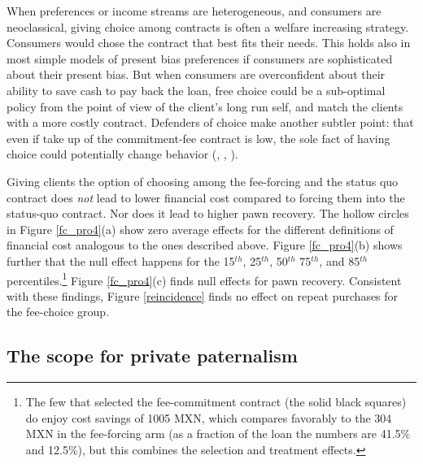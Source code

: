 \documentclass[oneside,11pt]{article}
\begin{document}
When preferences or income streams are heterogeneous, and consumers are neoclassical, giving choice among contracts is often a welfare increasing strategy. Consumers would chose the contract that best fits their needs. This holds also in most simple models of present bias preferences if consumers are sophisticated about their present bias. %
But when consumers are overconfident about their ability to save cash to pay back the loan, free choice could be a sub-optimal policy from the point of view of the client's long run self, and match the clients with a more costly contract. Defenders of choice make another subtler point: that even if take up of the commitment-fee contract is low, the sole fact of having choice could potentially change behavior (\cite{Dalboetal:2010}, \cite{Sjostrometal:2018}, \cite{Tlaxcala}). 

Giving clients the option of choosing among the fee-forcing and the status quo contract does \textit{not} lead to lower financial cost compared to forcing them into the status-quo contract. Nor does it lead to higher pawn recovery. The hollow circles in Figure \ref{fc_pro4}(a) show zero average effects for the different definitions of financial cost analogous to the ones described above. Figure \ref{fc_pro4}(b) shows further that the null effect happens for the 15$^{th}$, 25$^{th}$, 50$^{th}$ 75$^{th}$, and 85$^{th}$ percentiles.\footnote{The few that selected the fee-commitment contract (the solid black squares) do enjoy cost savings of 1005 MXN, which compares favorably to the 304 MXN in the fee-forcing arm (as a fraction of the loan the numbers are 41.5\% and 12.5\%), but this combines the selection and treatment effects.} %
Figure \ref{fc_pro4}(c) finds null effects for pawn recovery. Consistent with these findings, Figure \ref{reincidence} finds no effect on repeat purchases for the fee-choice group. 



\subsection{The scope for private paternalism}
    
\end{document}
